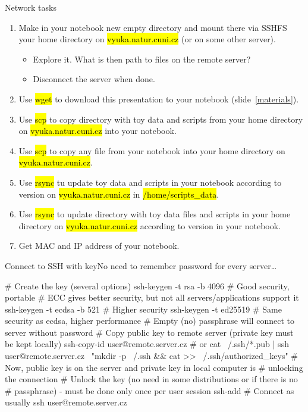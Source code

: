\documentclass[compress, ucs, xelatex, 11pt, xcolor=svgnames,
  hyperref={
    bookmarks=true,
    unicode=true,
    colorlinks=true,
    pdftitle={Linux, command line and MetaCentrum},
    plainpages=false,
    pdfauthor={Vojtech Zeisek},
    pdfsubject={Course about use of Linux command line, writing shell scripts and using MetaCentrum of CESNET},
    pdfcreator={XeLaTeX},
    pdfkeywords={Linux, GNU, BASH, shell, command line, MetaCentrum},
    linkcolor=DarkRed,
    anchorcolor=DarkBlue,
    citecolor=Indigo,
    filecolor=NavyBlue,
    menucolor=DarkMagenta,
    urlcolor=DarkBlue,
    pdftex},
  url={hyphens, lowtilde} %
  ]{beamer}
\renewcommand{\texttt}[1]{\hl{\ttfamily #1}}
\begin{document}
\begin{frame}{Network tasks}
  \begin{enumerate}
    \item Make in your notebook new empty directory and mount there via SSHFS your home directory on \texttt{vyuka.natur.cuni.cz} (or on some other server).
    \begin{itemize}
      \item Explore it. What is then path to files on the remote server?
      \item Disconnect the server when done.
    \end{itemize}
    \item Use \texttt{wget} to download this presentation to your notebook (slide~\ref{materials}).
    \item Use \texttt{scp} to copy directory with toy data and scripts from your home directory on \texttt{vyuka.natur.cuni.cz} into your notebook.
    \item Use \texttt{scp} to copy any file from your notebook into your home directory on \texttt{vyuka.natur.cuni.cz}.
    \item Use \texttt{rsync} tu update toy data and scripts in your notebook according to version on \texttt{vyuka.natur.cuni.cz} in \texttt{/home/scripts\_data}.
    \item Use \texttt{rsync} to update directory with toy data files and scripts in your home directory on \texttt{vyuka.natur.cuni.cz} according to version in your notebook.
    \item Get MAC and IP address of your notebook.
  \end{enumerate}
\end{frame}

\begin{frame}[fragile]{Connect to SSH with key}{No need to remember password for every server\ldots}
  \begin{bashcode}
    # Create the key (several options)
    ssh-keygen -t rsa -b 4096 # Good security, portable
    # ECC gives better security, but not all servers/applications support it
    ssh-keygen -t ecdsa -b 521 # Higher security
    ssh-keygen -t ed25519 # Same security as ecdsa, higher performance
    # Empty (no) passphrase will connect to server without password
    # Copy public key to remote server (private key must be kept locally)
    ssh-copy-id user@remote.server.cz # or
    cat ~/.ssh/*.pub | ssh user@remote.server.cz \
      "mkdir -p ~/.ssh && cat >> ~/.ssh/authorized_keys"
    # Now, public key is on the server and private key in local computer is
    # unlocking the connection
    # Unlock the key (no need in some distributions or if there is no
    # passphrase) - must be done only once per user session
    ssh-add
    # Connect as usually
    ssh user@remote.server.cz
  \end{bashcode}
\end{frame}
\end{document}
